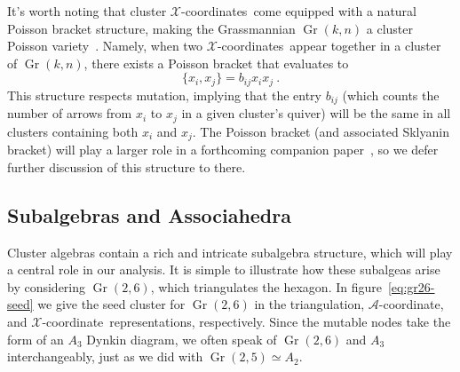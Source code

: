 \documentclass[11pt]{article}
\DeclareMathOperator{\Gr}{Gr}
\def\xcoord{$\mathcal{X}$-coordinate}
\def\xcoords{$\mathcal{X}$-coordinates}
\def\acoord{$\mathcal{A}$-coordinate}
\begin{document}
It's worth noting that cluster \xcoords\ come equipped with a natural Poisson bracket structure, making the Grassmannian $\Gr(k,n)$ a cluster Poisson variety~\cite{}. Namely, when two \xcoords\ appear together in a cluster of $\Gr(k,n)$, there exists a Poisson bracket that evaluates to
\begin{equation}
\{x_i, x_j \} = b_{ij} x_i x_j \ .
\end{equation}
This structure respects mutation, implying that the entry $b_{ij}$ (which counts the number of arrows from $x_i$ to $x_j$ in a given cluster's quiver) will be the same in all clusters containing both $x_i$ and $x_j$. The Poisson bracket (and associated Sklyanin bracket) will play a larger role in a forthcoming companion paper~\cite{}, so we defer further discussion of this structure to there.

\subsection{Subalgebras and Associahedra}\label{sec:subalgebras_associahedra}

Cluster algebras contain a rich and intricate subalgebra structure, which will play a central role in our analysis. It is simple to illustrate how these subalgeas arise by considering $\Gr(2,6)$, which triangulates the hexagon. In figure~\ref{eq:gr26-seed} we give the seed cluster for $\Gr(2,6)$ in the triangulation, \acoord, and \xcoord\ representations, respectively. Since the mutable nodes take the form of an $A_3$ Dynkin diagram, we often speak of $\Gr(2,6)$ and $A_3$ interchangeably, just as we did with $\Gr(2,5) \simeq A_2$. 
\end{document}
